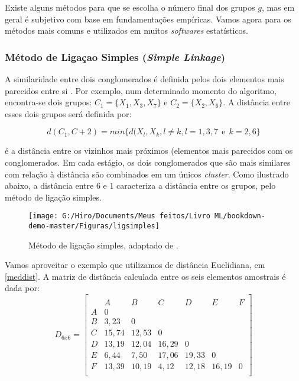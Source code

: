 \documentclass[
]{book}
\begin{document}
Existe alguns métodos para que se escolha o número final dos grupos \(g\), mas em geral é subjetivo com base em fundamentações empíricas. Vamos agora para os métodos mais comuns e utilizados em muitos \emph{softwares} estatísticos.

\hypertarget{muxe9todo-de-ligauxe7ao-simples-simple-linkage}{%
\subsubsection{\texorpdfstring{Método de Ligaçao Simples (\emph{Simple Linkage})}{Método de Ligaçao Simples (Simple Linkage)}}\label{muxe9todo-de-ligauxe7ao-simples-simple-linkage}}

A similaridade entre dois conglomerados é definida pelos dois elementos mais parecidos entre si \citep{sneath1957application}. Por exemplo, num determinado momento do algoritmo, encontra-se dois grupos: \(C_1=\{X_1,X_3,X_7\}\) e \(C_2=\{X_2,X_6\}\). A distância entre esses dois grupos será definida por:

\begin{equation}
    d(C_1,C+2)=min\{d(X_l,X_k, l\neq k, l=1,3,7 \ \ \mbox{e} \ \ k=2,6\}
    \label{eq:ligsimples}
\end{equation}

é a distância entre os vizinhos mais próximos (elementos mais parecidos com os conglomerados. Em cada estágio, os dois conglomerados que são mais similares com relação à distância são combinados em um únicos \emph{cluster}. Como ilustrado abaixo, a distância entre 6 e 1 caracteriza a distância entre os grupos, pelo método de ligação simples.

\begin{figure}

{\centering \texttt{[image: G:/Hiro/Documents/Meus feitos/Livro ML/bookdown-demo-master/Figuras/ligsimples]} 

}

\caption{Método de ligação simples, adaptado de \citet{mingoti2007analise}.}\label{fig:ligsimples}
\end{figure}



Vamos aproveitar o exemplo que utilizamos de distância Euclidiana, em \ref{meddist}. A matriz de distância calculada entre os seis elementos amostrais é dada por:
\[D_{6x6}=\begin{bmatrix}\\
 &A&B&C&D&E&F \\
 A&0&&&&&\\
 B&3,23&0&&&&\\
 C & 15,74& 12,53&0&&&\\
 D& 13,19& 12,04& 16,29&0&&\\
 E& 6,44& 7,50& 17,06& 19,33&0&\\
 F& 13,39& 10,19& 4,12& 12,18& 16,19&0 \\
\end{bmatrix}\]
\end{document}
